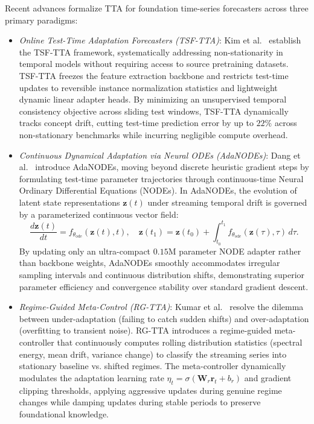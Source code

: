 Recent advances formalize TTA for foundation time-series forecasters across three primary paradigms:
\begin{itemize}[leftmargin=*]
    \item \emph{Online Test-Time Adaptation Forecasters (TSF-TTA)}: Kim et al.~\cite{kim2025battling} establish the TSF-TTA framework, systematically addressing non-stationarity in temporal models without requiring access to source pretraining datasets. TSF-TTA freezes the feature extraction backbone and restricts test-time updates to reversible instance normalization statistics and lightweight dynamic linear adapter heads. By minimizing an unsupervised temporal consistency objective across sliding test windows, TSF-TTA dynamically tracks concept drift, cutting test-time prediction error by up to $22\%$ across non-stationary benchmarks while incurring negligible compute overhead.
    \item \emph{Continuous Dynamical Adaptation via Neural ODEs (AdaNODEs)}: Dang et al.~\cite{dang2026adanodes} introduce AdaNODEs, moving beyond discrete heuristic gradient steps by formulating test-time parameter trajectories through continuous-time Neural Ordinary Differential Equations (NODEs). In AdaNODEs, the evolution of latent state representations $\mathbf{z}(t)$ under streaming temporal drift is governed by a parameterized continuous vector field:
    \begin{equation}
        \frac{d\mathbf{z}(t)}{dt} = f_{\theta_{\text{ode}}}(\mathbf{z}(t), t), \quad \mathbf{z}(t_1) = \mathbf{z}(t_0) + \int_{t_0}^{t_1} f_{\theta_{\text{ode}}}(\mathbf{z}(\tau), \tau) \, d\tau.
    \end{equation}
    By updating only an ultra-compact $0.15\text{M}$ parameter NODE adapter rather than backbone weights, AdaNODEs smoothly accommodates irregular sampling intervals and continuous distribution shifts, demonstrating superior parameter efficiency and convergence stability over standard gradient descent.
    \item \emph{Regime-Guided Meta-Control (RG-TTA)}: Kumar et al.~\cite{kumar2026rgtta} resolve the dilemma between under-adaptation (failing to catch sudden shifts) and over-adaptation (overfitting to transient noise). RG-TTA introduces a regime-guided meta-controller that continuously computes rolling distribution statistics (spectral energy, mean drift, variance change) to classify the streaming series into stationary baseline vs. shifted regimes. The meta-controller dynamically modulates the adaptation learning rate $\eta_t = \sigma(\mathbf{W}_r \mathbf{r}_t + b_r)$ and gradient clipping thresholds, applying aggressive updates during genuine regime changes while damping updates during stable periods to preserve foundational knowledge.
\end{itemize}

